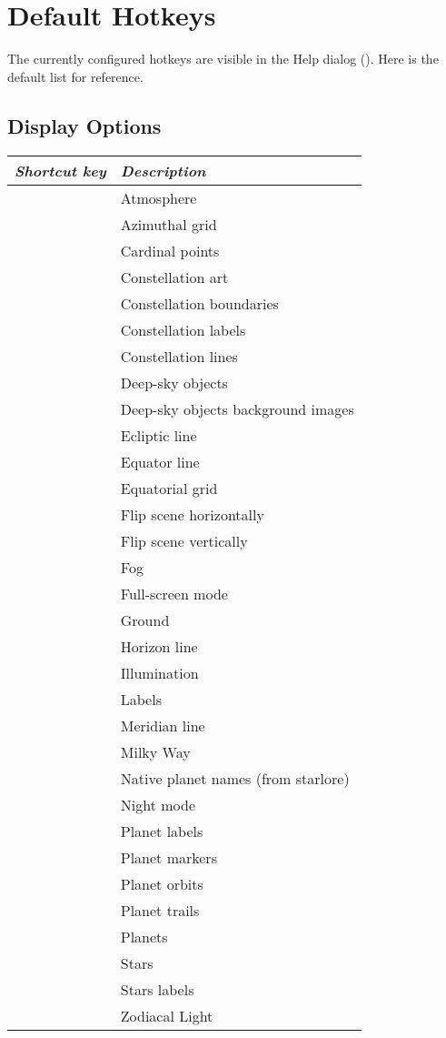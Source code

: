 
\chapter{Default Hotkeys}
\label{ch:Hotkeys}

The currently configured hotkeys are visible in the Help dialog (). Here is the default list for reference.

\section{Display Options}
\label{ch:Hotkeys:DisplayOptions}
\begin{longtabu}to \textwidth {cl}\toprule
\emph{Shortcut key}	& \emph{Description}\\\midrule
{}				& Atmosphere \\
				& Azimuthal grid \\
				& Cardinal points \\
				& Constellation art \\
				& Constellation boundaries \\
				& Constellation labels \\
				& Constellation lines \\
				& Deep-sky objects \\
				& Deep-sky objects background images \\
\key{,} 			& Ecliptic line \\
				& Equator line \\
 			& Equatorial grid \\
	& Flip scene horizontally \\
	& Flip scene vertically \\
 			& Fog \\
 			& Full-screen mode \\
 			& Ground \\
 			& Horizon line \\
		& Illumination \\
	& Labels \\
\key{;} 			& Meridian line \\
 			& Milky Way \\
	& Native planet names (from starlore) \\
 		& Night mode \\
 		& Planet labels \\
		& Planet markers \\
 			& Planet orbits \\
		& Planet trails \\
 			& Planets \\
 			& Stars \\
			& Stars labels \\
	& Zodiacal Light \\
\bottomrule
\end{longtabu}


